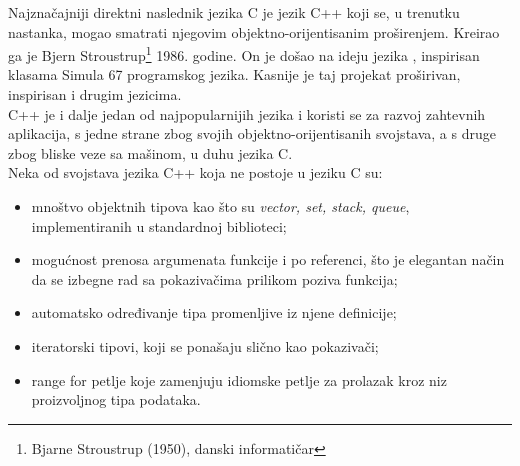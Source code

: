 \documentclass[a4paper]{article}
\begin{document}
{Najznačajniji direktni naslednik jezika C je jezik C++ koji se, u trenutku nastanka, mogao smatrati njegovim objektno-orijentisanim proširenjem. Kreirao ga je Bjern Stroustrup\footnote{Bjarne Stroustrup (1950), danski informatičar} 1986. godine. On je došao na ideju jezika , inspirisan klasama Simula 67 programskog jezika. Kasnije je taj projekat proširivan, inspirisan i drugim jezicima.
\\
C++ je i dalje jedan od najpopularnijih jezika i koristi se za razvoj zahtevnih aplikacija, s jedne strane zbog svojih objektno-orijentisanih svojstava, a s druge zbog bliske veze sa mašinom, u duhu jezika C.\\

Neka od svojstava jezika C++ koja ne postoje u jeziku C su:
\begin{itemize}
    \item mnoštvo objektnih tipova kao što su {\em vector, set, stack, queue}, implementiranih u standardnoj biblioteci;
    \item mogućnost prenosa argumenata funkcije i po referenci, što je elegantan način da se izbegne rad sa pokazivačima prilikom poziva funkcija;
    \item automatsko određivanje tipa promenljive iz njene definicije;
    \item iteratorski tipovi, koji se ponašaju slično kao pokazivači;
    \item range for petlje koje zamenjuju idiomske petlje za prolazak kroz niz proizvoljnog tipa podataka.
\end{itemize}

}
\end{document}
